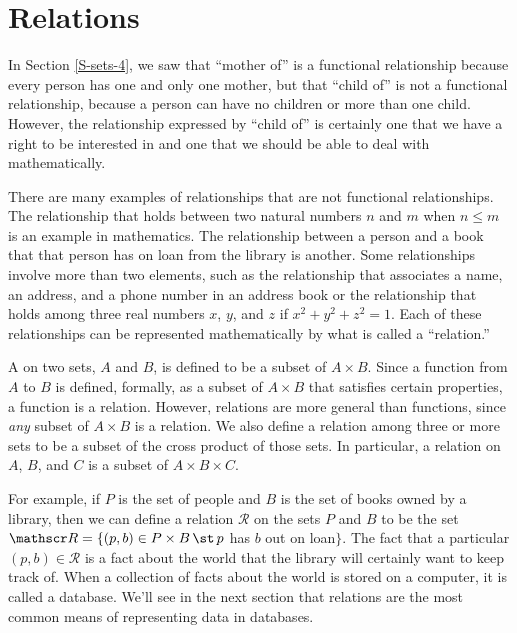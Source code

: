 \section{Relations}\label{S-sets-7}

In Section \ref{S-sets-4}, we saw that ``mother of'' is a functional
relationship because every person has one and only one mother,
but that ``child of'' is not a functional relationship,
because a person can have no children or more than one child.
However, the relationship expressed by ``child of'' is certainly 
one that we have a right to be interested in and one
that we should be able to deal with mathematically.

There are many examples of relationships that are not functional
relationships.  The relationship that holds between two 
natural numbers $n$ and $m$ when $n\le m$ is an example in mathematics.
The relationship between a person and a book that that person has
on loan from the library is another.  Some relationships
involve more than two elements, such as the relationship
that associates a name, an address, and a phone number in
an address book or the relationship that holds among three
real numbers $x$, $y$, and $z$ if $x^2+y^2+z^2=1$.  Each of
these relationships can be represented mathematically by
what is called a ``relation.''

A  on two sets, $A$ and $B$, is defined to be a subset
of $A\times B$.  Since a function from $A$ to $B$ is defined, formally, as
a subset of $A\times B$ that satisfies certain properties, a function
is a relation.  However, relations are more general than functions,
since \emph{any} subset of $A\times B$ is a relation.  We also
define a relation among three or more sets to be a subset of the
cross product of those sets.  In particular, a relation on
$A$, $B$, and $C$ is a subset of $A\times B\times C$.

For example, if $P$ is the set of people and $B$ is the set of books owned
by a library, then we can define a relation ${\mathscr R}$ on the sets
$P$ and $B$ to be the set ${\mathscr R}=\{(p,b)\in P\times B\,\st\, p$
has $b$ out on loan$\}$.  The fact that a particular 
$(p,b)\in{\mathscr R}$ is a fact about the world that the library
will certainly want to keep track of.  When a collection of
facts about the world is stored on a computer, it is called
a database.  We'll see in the next section that
relations are the most common means of representing data in
databases.

